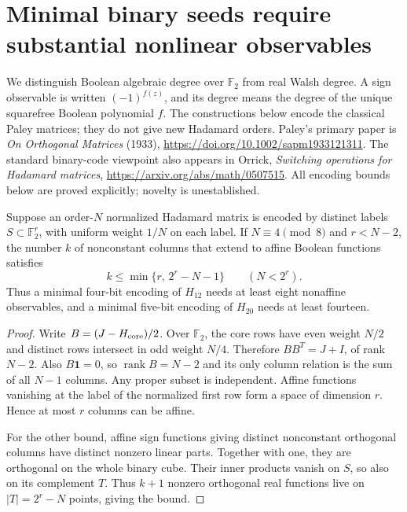 \section{Minimal binary seeds require substantial nonlinear observables}
\label{sec:nonlinear-seeds}
We distinguish Boolean algebraic degree over $\mathbb F_2$ from real
Walsh degree. A sign observable is written $(-1)^{f(z)}$, and its degree
means the degree of the unique squarefree Boolean polynomial $f$.
The constructions below encode the classical Paley matrices; they do
not give new Hadamard orders. Paley's primary paper is
\emph{On Orthogonal Matrices} (1933),
\url{https://doi.org/10.1002/sapm1933121311}. The standard binary-code
viewpoint also appears in Orrick, \emph{Switching operations for Hadamard
matrices}, \url{https://arxiv.org/abs/math/0507515}.
All encoding bounds below are proved explicitly; novelty is unestablished.

\begin{proposition}
\label{prop:nonlinear-affine-budget}
Suppose an order-$N$ normalized Hadamard matrix is encoded by distinct
labels $S\subset\mathbb F_2^r$, with uniform weight $1/N$ on each label.
If $N\equiv4\pmod8$ and $r<N-2$, the number $k$ of nonconstant columns
that extend to affine Boolean functions satisfies
\[
 k\le\min\{r,\,2^r-N-1\}\qquad(N<2^r).
\]
Thus a minimal four-bit encoding of $H_{12}$ needs at least eight
nonaffine observables, and a minimal five-bit encoding of $H_{20}$
needs at least fourteen.
\end{proposition}
\begin{proof}
Write $B=(J-H_{\rm core})/2$. Over $\mathbb F_2$, the core rows have
even weight $N/2$ and distinct rows intersect in odd weight $N/4$.
Therefore $BB^T=J+I$, of rank $N-2$. Also $B\mathbf1=0$, so
$\operatorname{rank}B=N-2$ and its only column relation is the sum
of all $N-1$ columns. Any proper subset is independent. Affine functions
vanishing at the label of the normalized first row form a space of
dimension $r$. Hence at most $r$ columns can be affine.

For the other bound, affine sign functions giving distinct nonconstant
orthogonal columns have distinct nonzero linear parts. Together with
one, they are orthogonal on the whole binary cube. Their inner products
vanish on $S$, so also on its complement $T$. Thus $k+1$ nonzero
orthogonal real functions live on $|T|=2^r-N$ points, giving the bound.
\end{proof}

